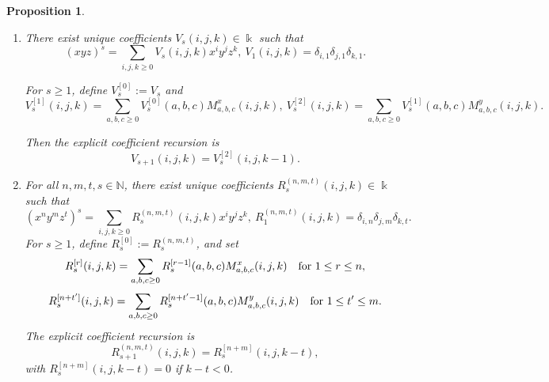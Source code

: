 \documentclass{amsart}
\newtheorem{proposition}[theorem]{Proposition}
\theoremstyle{definition}
\theoremstyle{remark}
\numberwithin{equation}{section}
\begin{document}
\begin{proposition}
\begin{enumerate}
\item[\rm (3)] There exist unique coefficients $V_s(i,j,k)\in\Bbbk$ such that
\begin{equation}\label{Vdefcase5i}
(xyz)^s=\sum_{i,j,k\ge 0}V_s(i,j,k) x^i y^j z^k,\ V_1(i,j,k)=\delta_{i,1}\delta_{j,1}\delta_{k,1}.
\end{equation}

For $s\ge 1$, define $V^{[0]}_{s}:=V_s$ and
\[
V^{[1]}_{s}(i,j,k)=\sum_{a,b,c\ge 0}V^{[0]}_{s}(a,b,c) M^x_{a,b,c}(i,j,k),\
V^{[2]}_{s}(i,j,k)=\sum_{a,b,c\ge 0}V^{[1]}_{s}(a,b,c) M^y_{a,b,c}(i,j,k).
\]

Then the explicit coefficient recursion is
\begin{equation}\label{Vreccase5i}
V_{s+1}(i,j,k)=V^{[2]}_{s}(i,j,k-1).
\end{equation}

\item [\rm (4)] For all $n,m,t,s\in\mathbb N$, there exist unique coefficients $R^{(n,m,t)}_{s}(i,j,k)\in\Bbbk$ such that
\begin{equation}\label{Rdefcase5i}
(x^n y^m z^t)^s=\sum_{i,j,k\ge 0}R^{(n,m,t)}_{s}(i,j,k) x^i y^j z^k, \ R^{(n,m,t)}_{1}(i,j,k)=\delta_{i,n}\delta_{j,m}\delta_{k,t}.
\end{equation}
For $s\ge 1$, define $R^{[0]}_{s}:=R^{(n,m,t)}_{s}$, and set
\[
R^{[r]}_{s}(i,j,k)=\sum_{a,b,c\ge 0}R^{[r-1]}_{s}(a,b,c) M^x_{a,b,c}(i,j,k) \quad {\rm for} \, \,  1\le r\le n,
\]
\[
R^{[n+t']}_{s}(i,j,k)=\sum_{a,b,c\ge 0}R^{[n+t'-1]}_{s}(a,b,c) M^y_{a,b,c}(i,j,k) \quad {\rm for} \, \, 1\le t'\le m.
\]
The explicit coefficient recursion is
\begin{equation}\label{Rreccase5i}
R^{(n,m,t)}_{s+1}(i,j,k)=R^{[n+m]}_{s}(i,j,k-t),
\end{equation}
with $R^{[n+m]}_{s}(i,j,k-t)=0$ if $k-t<0$.


\end{enumerate}
\end{proposition}
\end{document}
